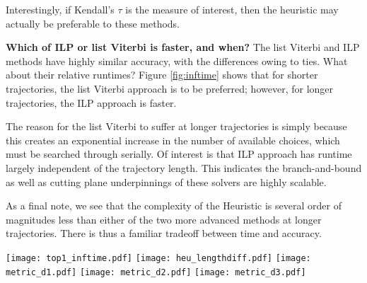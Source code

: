 Interestingly, if Kendall's $\tau$ is the measure of interest, then the heuristic may actually be preferable to these methods.

\textbf{Which of ILP or list Viterbi is faster, and when?}
The list Viterbi and ILP methods have highly similar accuracy, with the differences owing to ties.
What about their relative runtimes?
Figure \ref{fig:inftime} shows that for shorter trajectories, the list Viterbi approach is to be preferred;
however, for longer trajectories, the ILP approach is faster.

The reason for the list Viterbi to suffer at longer trajectories is simply because this creates an exponential increase in the number of available choices, which must be searched through serially.
Of interest is that ILP approach has runtime largely independent of the trajectory length.
This indicates the branch-and-bound as well as cutting plane underpinnings of these solvers are highly scalable.

As a final note, we see that the complexity of the Heuristic is several order of magnitudes less than either of the two more advanced methods at longer trajectories.
There is thus a familiar tradeoff between time and accuracy.



\begin{figure*}[!t]
\begin{minipage}[c]{\textwidth}
		\centering
		\texttt{[image: top1\_inftime.pdf]}
	    \label{fig:inftime}
		\centering
		\texttt{[image: heu\_lengthdiff.pdf]}
	    \label{fig:length-christo}
		\centering
		\texttt{[image: metric\_d1.pdf]}
		\texttt{[image: metric\_d2.pdf]}
		\texttt{[image: metric\_d3.pdf]}
	    \label{fig:acc-vs-length}
\end{minipage}
\end{figure*}
